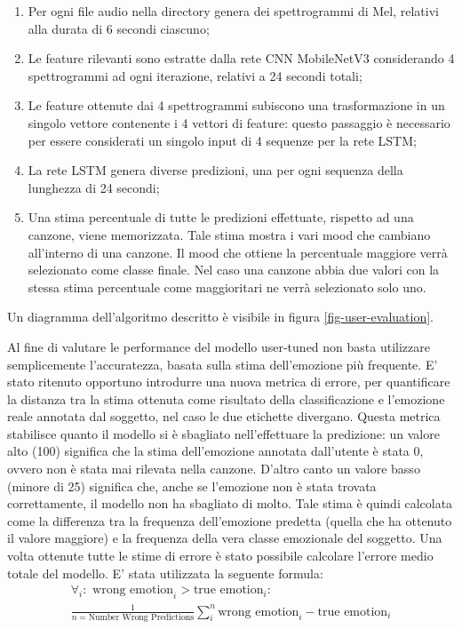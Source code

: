\documentclass[11pt]{report}
\begin{document}
\begin{enumerate}
    \item Per ogni file audio nella directory genera dei spettrogrammi di Mel, relativi alla durata di 6 secondi ciascuno;
    
    \item Le feature rilevanti sono estratte dalla rete CNN MobileNetV3 considerando 4 spettrogrammi ad ogni iterazione, relativi a 24 secondi totali;
    
    \item Le feature ottenute dai 4 spettrogrammi subiscono una trasformazione in un singolo vettore contenente i 4 vettori di feature: questo passaggio è necessario per essere considerati un singolo input di 4 sequenze per la rete LSTM;
    
    \item  La rete LSTM genera diverse predizioni, una per ogni sequenza della lunghezza di 24 secondi;
    
    \item Una stima percentuale di tutte le predizioni effettuate, rispetto ad una canzone, viene memorizzata. Tale stima mostra i vari mood che cambiano all'interno di una canzone. Il mood che ottiene la percentuale maggiore verrà selezionato come classe finale. Nel caso una canzone abbia due valori con la stessa stima percentuale come maggioritari ne verrà selezionato solo uno.
    
    
\end{enumerate}

Un diagramma dell'algoritmo descritto è visibile in figura \ref{fig-user-evaluation}.


\newpage

Al fine di valutare le performance del modello user-tuned non basta utilizzare semplicemente l'accuratezza, basata sulla stima dell'emozione più frequente. E' stato ritenuto opportuno introdurre una nuova metrica di errore, per quantificare la distanza tra la stima ottenuta come risultato della classificazione e l'emozione reale annotata dal soggetto, nel caso le due etichette divergano. Questa metrica stabilisce quanto il modello si è sbagliato nell'effettuare la predizione: un valore alto (100) significa che la stima dell'emozione annotata dall'utente è stata 0, ovvero non è stata mai rilevata nella canzone. D'altro canto un valore basso (minore di 25) significa che, anche se l'emozione non è stata trovata correttamente, il modello non ha sbagliato di molto. Tale stima è quindi calcolata come la differenza tra la frequenza dell'emozione predetta (quella che ha ottenuto il valore maggiore) e la frequenza della vera classe emozionale del soggetto. Una volta ottenute tutte le stime di errore è stato possibile calcolare l'errore medio totale del modello. E' stata utilizzata la seguente formula:
\begin{equation}
\begin{multlined}
\forall_i: \text{ wrong emotion}_i > \text{true emotion}_i: \\
\frac{1}{n  = \text{Number Wrong Predictions}} \sum_{i}^n \text{wrong emotion}_i - \text{true emotion}_i
\end{multlined}
\end{equation}
\end{document}
